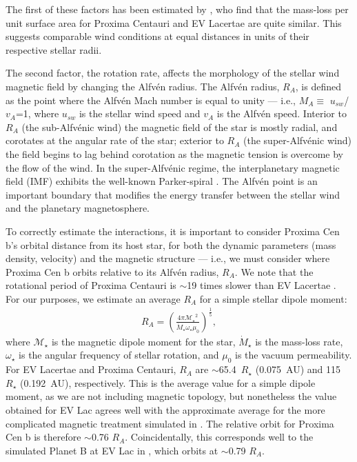 \documentclass{emulateapj}
\newcommand{\XXX}[1]{#1}      %
\begin{document}
The first of these factors has been estimated by \citet{Wood2005}, who find that the mass-loss per unit surface area for Proxima Centauri and EV Lacertae are quite similar.   This suggests comparable wind conditions at equal distances in units of their respective stellar radii. 

The second factor, the rotation rate, affects the morphology of the stellar wind magnetic field by changing the Alfv\'{e}n radius.  The Alfv\'{e}n radius, $R_A$, is defined as the point where the Alfv\'{e}n Mach number is equal to unity --- i.e., $M_A \equiv$ $u_{sw}$/$v_{A}$=1, where $u_{sw}$ is the stellar wind speed and $v_A$ is the Alfv\'{e}n speed. Interior to $R_A$ (the sub-Alfv\'{e}nic wind) the magnetic field of the star is mostly radial, and corotates at the angular rate of the star; exterior to $R_A$ (the super-Alfv\'{e}nic wind) the field begins to lag behind corotation as the magnetic tension is overcome by the flow of the wind. In the super-Alfv\'{e}nic regime, the interplanetary magnetic field (IMF) exhibits the well-known Parker-spiral \citep{Parker1958}. The Alfv\'{e}n point is an important boundary that modifies the energy transfer between the stellar wind and the planetary magnetosphere.

\XXX{To correctly estimate the interactions, it is important to consider Proxima Cen b's orbital distance from its host star, for both the dynamic parameters (mass density, velocity) and the magnetic structure --- i.e., we must consider where Proxima Cen b orbits relative to its Alfv\'{e}n radius, $R_A$. We note that the rotational period of Proxima Centauri \citep[82.6 days;][]{Collins2016} is $\sim$19 times slower than EV Lacertae \citep[4.376 days;][]{Testa2004}}. For our purposes, we estimate an average $R_A$ for a simple stellar dipole moment:
\begin{align}
    R_A = \left( \frac{4 \pi \mathcal{M_\star}^2}{\dot{M}_\star \omega_\star \mu_0} \right)^{\frac{1}{5}},
\end{align}
\noindent where $\mathcal{M_\star}$ is the magnetic dipole moment for the star, $\dot{M}_\star$ is the mass-loss rate, $\omega_\star$ is the angular frequency of stellar rotation, and $\mu_0$ is the vacuum permeability. For EV Lacertae and Proxima Centauri, $R_A$ are $\sim$65.4~$R_\star$ \XXX{(0.075~AU)} and 115~$R_\star$ \XXX{(0.192~AU)}, respectively. This is the average value for a simple dipole moment, as we are not including magnetic topology, but nonetheless the value obtained for EV Lac agrees well with the approximate average for the more complicated magnetic treatment simulated in \citet{Cohen2014}. The relative orbit for Proxima Cen b is therefore $\sim$0.76 $R_A$. Coincidentally, this corresponds well to the simulated Planet B at EV Lac in \citet{Cohen2014}, which orbits at $\sim$0.79 $R_A$. 
\end{document}
